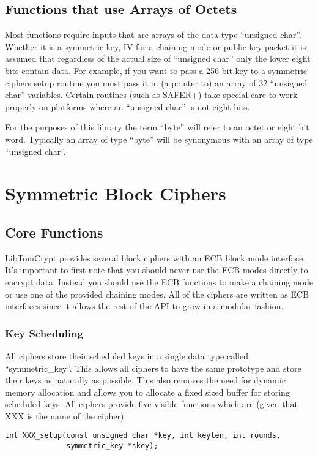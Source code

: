 \documentclass[a4paper]{book}
\begin{document}
\section{Functions that use Arrays of Octets}
Most functions require inputs that are arrays of the data type ``unsigned char''.  Whether it is a symmetric key, IV
for a chaining mode or public key packet it is assumed that regardless of the actual size of ``unsigned char'' only the
lower eight bits contain data.  For example, if you want to pass a 256 bit key to a symmetric ciphers setup routine
you must pass it in (a pointer to) an array of 32 ``unsigned char'' variables.  Certain routines 
(such as SAFER+) take special care to work properly on platforms where an ``unsigned char'' is not eight bits.

For the purposes of this library the term ``byte'' will refer to an octet or eight bit word.  Typically an array of
type ``byte'' will be synonymous with an array of type ``unsigned char''.

\chapter{Symmetric Block Ciphers}
\section{Core Functions}

LibTomCrypt provides several block ciphers with an ECB block mode interface.  It's important to first note that you 
should never use the ECB modes directly to encrypt data.  Instead you should use the ECB functions to make a chaining mode
or use one of the provided chaining modes.  All of the ciphers are written as ECB interfaces since it allows the rest of
the API to grow in a modular fashion.

\subsection{Key Scheduling}
All ciphers store their scheduled keys in a single data type called ``symmetric\_key''.  This allows all ciphers to 
have the same prototype and store their keys as naturally as possible.  This also removes the need for dynamic memory
allocation and allows you to allocate a fixed sized buffer for storing scheduled keys.  All ciphers provide five visible 
functions which are (given that XXX is the name of the cipher):
\begin{verbatim}
int XXX_setup(const unsigned char *key, int keylen, int rounds,
              symmetric_key *skey);
\end{verbatim}
\end{document}
